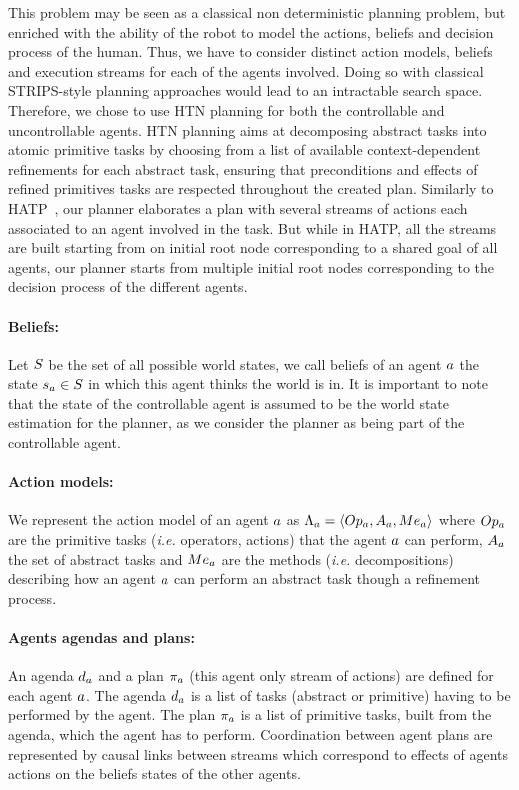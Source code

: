 \documentclass[a4paper,11pt,twoside]{StyleThese}
\begin{document}
This problem may be seen as a classical non deterministic planning problem, but enriched with the ability of the robot to model the actions, beliefs and decision process of the human. Thus, we have to consider distinct action models, beliefs and execution streams for each of the agents involved. Doing so with classical STRIPS-style planning approaches would lead to an intractable search space. Therefore, we chose to use HTN planning for both the controllable and uncontrollable agents. HTN planning aims at decomposing abstract tasks into atomic primitive tasks by choosing from a list of available context-dependent refinements for each abstract task, ensuring that preconditions and effects of refined primitives tasks are respected throughout the created plan. Similarly to HATP~\cite{sebastiani2017dealing}, our planner elaborates a plan with several streams of actions each associated to an agent involved in the task. But while in HATP, all the streams are built starting from on initial root node corresponding to a shared goal of all agents, our planner starts from multiple initial root nodes corresponding to the decision process of the different agents.

\paragraph{\bf Beliefs:}
Let $S$ be the set of all possible world states, we call beliefs of an agent $a$ the state $s_{a} \in S$ in which this agent thinks the world is in. It is important to note that the state of the controllable agent is assumed to be the world state estimation for the planner, as we consider the planner as being part of the controllable agent.

\paragraph{\bf Action models:}
We represent the action model of an agent $a$ as $\Lambda_{a} = \langle Op_{a}, A_{a}, Me_{a} \rangle$ where $Op_{a}$ are the primitive tasks (\textit{i.e.} operators, actions) that the agent $a$ can perform, $A_{a}$ the set of abstract tasks and $Me_{a}$ are the methods (\textit{i.e.} decompositions) describing how an agent $a$ can perform an abstract task though a refinement process.

\paragraph{\bf Agents agendas and plans:}
An agenda $d_{a}$ and a plan $\pi_{a}$ (this agent only stream of actions) are defined for each agent $a$. The agenda $d_{a}$ is a list of tasks (abstract or primitive) having to be performed by the agent. The plan $\pi_{a}$ is a list of primitive tasks, built from the agenda, which the agent has to perform.
Coordination between agent plans are represented by causal links between streams which correspond to effects of agents actions on the beliefs states of the other agents. 
\end{document}
